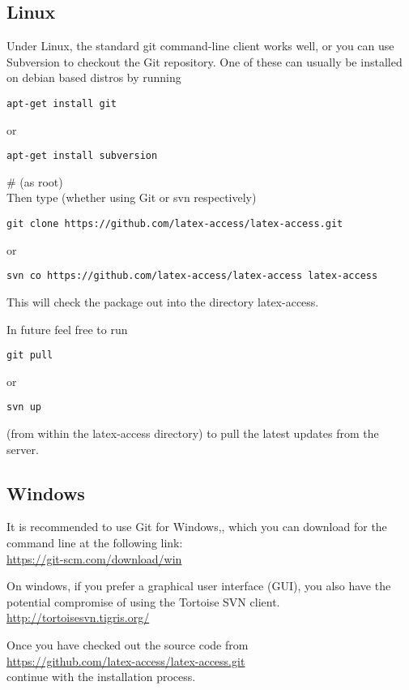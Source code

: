 \documentclass[12pt,a4paper]{report}
\begin{document}
\subsection{Linux}
\label{subsubchap-linux}

Under Linux, the standard git command-line client works
well, or you can use Subversion to checkout the Git repository. One of these can usually be installed on debian based distros by running
\begin{verbatim}
apt-get install git
\end{verbatim}
or
\begin{verbatim}
apt-get install subversion
\end{verbatim}
\# (as root)\\
Then type (whether using Git or svn respectively)
\begin{verbatim}
git clone https://github.com/latex-access/latex-access.git
\end{verbatim}
or
\begin{verbatim}
svn co https://github.com/latex-access/latex-access latex-access
\end{verbatim}

This will check the package out into the directory latex-access.

In future feel free to run
\begin{verbatim}
git pull
\end{verbatim}
or
\begin{verbatim}
svn up
\end{verbatim}
(from within the latex-access directory) to pull the latest updates from
the server.

\subsection{Windows}
\label{subsubchap-windows}

It is recommended to use Git for Windows,, which you can download for the command line at the following link:\\
\url{https://git-scm.com/download/win}

On windows, if you prefer a graphical user interface (GUI), you also have the potential compromise of using the Tortoise SVN client.\\
\url{http://tortoisesvn.tigris.org/}

Once you have checked out the source code from\\
\url{https://github.com/latex-access/latex-access.git}\\
continue with the installation
process.
\end{document}
